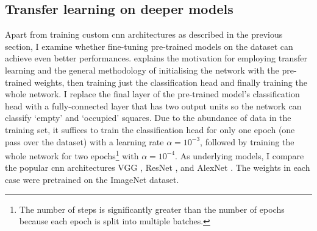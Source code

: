 \documentclass[../report.tex]{subfiles}
\begin{document}
\subsection{Transfer learning on deeper models}
\label{sec:occupancy_transfer_learning}
Apart from training custom \gls{cnn} architectures as described in the previous section, I examine whether fine-tuning pre-trained models on the dataset can achieve even better performances.
 explains the motivation for employing transfer learning and the general methodology of initialising the network with the pre-trained weights, then training just the classification head and finally training the whole network.
I replace the final layer of the pre-trained model's classification head with a fully-connected layer that has two output units so the network can classify `empty' and `occupied' squares.
Due to the abundance of data in the training set, it suffices to train the classification head for only one epoch (one pass over the dataset) with a learning rate $\alpha=10^{-3}$, followed by training the whole network for two epochs\footnote{The number of steps is significantly greater than the number of epochs because each epoch is split into multiple batches.} with $\alpha=10^{-4}$.
As underlying models, I compare the popular \gls{cnn} architectures
VGG \cite{simonyan2015},
ResNet \cite{he2016}, and
AlexNet \cite{krizhevsky2017}.
The weights in each case were pretrained on the ImageNet \cite{deng2009} dataset.
\end{document}

